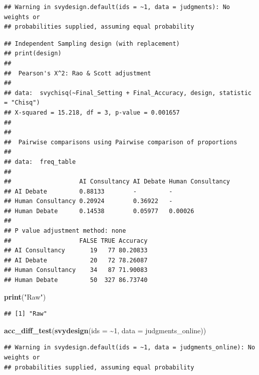 \documentclass[
]{article}
\newenvironment{Shaded}{\begin{snugshade}}{\end{snugshade}}
\newcommand{\AttributeTok}[1]{\textcolor[rgb]{0.13,0.29,0.53}{#1}}
\newcommand{\DecValTok}[1]{\textcolor[rgb]{0.00,0.00,0.81}{#1}}
\newcommand{\FunctionTok}[1]{\textcolor[rgb]{0.13,0.29,0.53}{\textbf{#1}}}
\newcommand{\NormalTok}[1]{#1}
\newcommand{\SpecialCharTok}[1]{\textcolor[rgb]{0.81,0.36,0.00}{\textbf{#1}}}
\newcommand{\StringTok}[1]{\textcolor[rgb]{0.31,0.60,0.02}{#1}}
\begin{document}
\begin{verbatim}
## Warning in svydesign.default(ids = ~1, data = judgments): No weights or
## probabilities supplied, assuming equal probability
\end{verbatim}

\begin{verbatim}
## Independent Sampling design (with replacement)
## print(design)
## 
##  Pearson's X^2: Rao & Scott adjustment
## 
## data:  svychisq(~Final_Setting + Final_Accuracy, design, statistic = "Chisq")
## X-squared = 15.218, df = 3, p-value = 0.001657
## 
## 
##  Pairwise comparisons using Pairwise comparison of proportions 
## 
## data:  freq_table 
## 
##                   AI Consultancy AI Debate Human Consultancy
## AI Debate         0.88133        -         -                
## Human Consultancy 0.20924        0.36922   -                
## Human Debate      0.14538        0.05977   0.00026          
## 
## P value adjustment method: none 
##                   FALSE TRUE Accuracy
## AI Consultancy       19   77 80.20833
## AI Debate            20   72 78.26087
## Human Consultancy    34   87 71.90083
## Human Debate         50  327 86.73740
\end{verbatim}

\begin{Shaded}
\begin{Highlighting}[]
\FunctionTok{print}\NormalTok{(}\StringTok{"Raw"}\NormalTok{)}
\end{Highlighting}
\end{Shaded}

\begin{verbatim}
## [1] "Raw"
\end{verbatim}

\begin{Shaded}
\begin{Highlighting}[]
\FunctionTok{acc\_diff\_test}\NormalTok{(}\FunctionTok{svydesign}\NormalTok{(}\AttributeTok{ids =} \SpecialCharTok{\textasciitilde{}}\DecValTok{1}\NormalTok{, }\AttributeTok{data =}\NormalTok{ judgments\_online))}
\end{Highlighting}
\end{Shaded}

\begin{verbatim}
## Warning in svydesign.default(ids = ~1, data = judgments_online): No weights or
## probabilities supplied, assuming equal probability
\end{verbatim}
\end{document}
